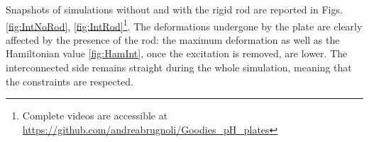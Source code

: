 \documentclass[letterpaper, 10 pt, conference]{ieeeconf}
\begin{document}
\begin{figure*}[th]
	\centering
	\hfil
	\hfil
	\caption{Snapshots at 4 different times ($t_{\text{end}} = 10 \,[ms]$) of a cantilever plate undergoing solicitation \eqref{eq:force_rod}.}
	\label{fig:IntNoRod}
\end{figure*}

\begin{figure*}[t]
	\centering
	\hfil
	\hfil
	\caption{Snapshots at 4 different times ($t_{\text{end}} = 10 \,[ms]$) of a cantilever plate undergoing solicitation \eqref{eq:force_rod}. The plate is connected to a rigid rod in $x = L_x$. Note the different deformation amplitude with respect to Fig. \ref{fig:IntNoRod}.}
	\label{fig:IntRod}
\end{figure*}
Snapshots of simulations without and with the rigid rod are reported in Figs. \ref{fig:IntNoRod}, \ref{fig:IntRod}\footnote{\label{note:1}Complete videos are accessible at \url{https://github.com/andreabrugnoli/Goodies_pH_plates}}. The deformations undergone by the plate are clearly affected by the presence of the rod: the maximum deformation as well as the Hamiltonian value \ref{fig:HamInt}, once the excitation is removed, are lower. The interconnected side remains straight during the whole simulation, meaning that the constraints are respected.
\end{document}
